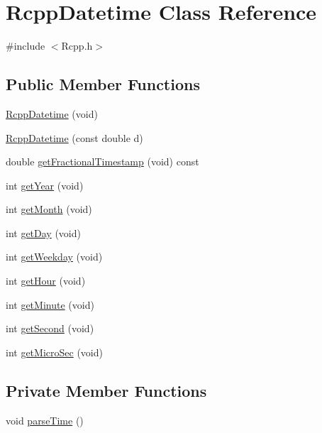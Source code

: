 \hypertarget{classRcppDatetime}{
\section{RcppDatetime Class Reference}
\label{classRcppDatetime}
}


{\ttfamily \#include $<$Rcpp.h$>$}\subsection*{Public Member Functions}
\begin{DoxyCompactItemize}
\item 
\hyperlink{classRcppDatetime_a5a1679444e775781bf038553ef3b04ae}{RcppDatetime} (void)
\item 
\hyperlink{classRcppDatetime_a43972d46cd15e6cb666d61f13bdc31f2}{RcppDatetime} (const double d)
\item 
double \hyperlink{classRcppDatetime_acb74d27387c0d851414e20d30354ac62}{getFractionalTimestamp} (void) const 
\item 
int \hyperlink{classRcppDatetime_aba930a8d7d575eb10444258a442027cf}{getYear} (void)
\item 
int \hyperlink{classRcppDatetime_aa7f04947d2a27e4bba2d19efa21771ed}{getMonth} (void)
\item 
int \hyperlink{classRcppDatetime_a23e9f09bef162e1ffef0e43f8a446b77}{getDay} (void)
\item 
int \hyperlink{classRcppDatetime_a796802561fa8bb87a8e2a1836afaaa58}{getWeekday} (void)
\item 
int \hyperlink{classRcppDatetime_a0da8db1ecd235a6e7ab309e70e4e93b0}{getHour} (void)
\item 
int \hyperlink{classRcppDatetime_adb41bd524ead66d69e129b1f2767358a}{getMinute} (void)
\item 
int \hyperlink{classRcppDatetime_a2feb900005890d183cc5f6a626c4d614}{getSecond} (void)
\item 
int \hyperlink{classRcppDatetime_acdf9e19f28c84fde38c352df5f225999}{getMicroSec} (void)
\end{DoxyCompactItemize}
\subsection*{Private Member Functions}
\begin{DoxyCompactItemize}
\item 
void \hyperlink{classRcppDatetime_aa4b2eba45c4c02b5d334dd89e080b660}{parseTime} ()
\end{DoxyCompactItemize}
